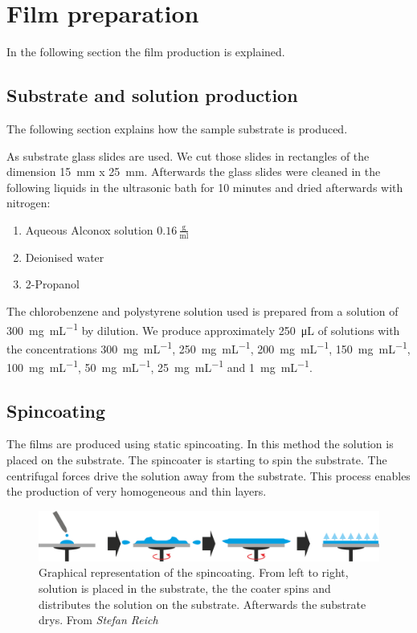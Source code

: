 \section{Film preparation}
\label{sec:FilmProd}

In the following section the film production is explained.

\subsection*{Substrate and solution production}

The following section explains how the sample substrate is produced.

As substrate glass slides are used. We cut those slides in rectangles of the dimension \SI[]{15}{mm} x \SI[]{25}{mm}. Afterwards the
glass slides were cleaned in the following liquids in the ultrasonic bath for 10 minutes and dried afterwards with nitrogen:

\begin{enumerate}
    \item Aqueous Alconox solution $0.16\,\frac{\mathrm{g}}{\mathrm{ml}}$
    \item Deionised water
    \item 2-Propanol
\end{enumerate}

The chlorobenzene and polystyrene solution used is prepared from a solution of \SI{300}{\milli\gram\per\milli\liter} by dilution. 
We produce approximately \SI{250}{\micro\liter} of solutions with the concentrations \SI{300}{\milli\gram\per\milli\liter}, \SI{250}{\milli\gram\per\milli\liter}, \SI{200}{\milli\gram\per\milli\liter},
\SI{150}{\milli\gram\per\milli\liter}, \SI{100}{\milli\gram\per\milli\liter}, \SI{50}{\milli\gram\per\milli\liter}, \SI{25}{\milli\gram\per\milli\liter} and \SI{1}{\milli\gram\per\milli\liter}.

\subsection*{Spincoating}

The films are produced using static spincoating.
In this method the solution is placed on the substrate. The spincoater is starting to spin the substrate. The centrifugal forces drive the solution away from the substrate.
This process enables the production of very homogeneous and thin layers.  

\begin{figure}[ht]
    \centering
    \includegraphics[width = \linewidth]{Bilder/Grundlagen/Spincoating.png}
    \caption[Graphical representation of the spincoating]{Graphical representation of the spincoating. From left to right, solution is placed in the substrate, the the coater spins and distributes the solution on the substrate. Afterwards the substrate drys.  From \textit{Stefan Reich \protect\footnotemark} }
    \label{fig:Spincoat}
\end{figure}

